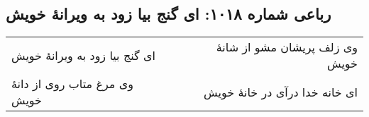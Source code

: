 \begin{center}
\section*{رباعی شماره ۱۰۱۸: ای گنج بیا زود به ویرانهٔ خویش}
\label{sec:1018}
\begin{longtable}{l p{0.5cm} r}
ای گنج بیا زود به ویرانهٔ خویش
&&
وی زلف پریشان مشو از شانهٔ خویش
\\
وی مرغ متاب روی از دانهٔ خویش
&&
ای خانه خدا درآی در خانهٔ خویش
\\
\end{longtable}
\end{center}
